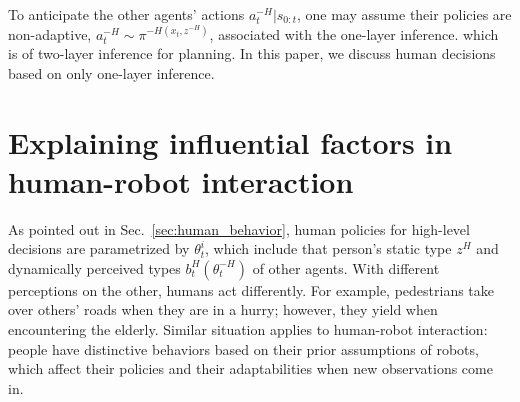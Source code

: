\documentclass[letterpaper, 10 pt, conference]{ieeeconf}  %
\begin{document}
To anticipate the other agents' actions $a^{-H}_{t}|s_{0:t}$, one may assume 
their policies are non-adaptive, $a^{-H}_t \sim \pi^{-H(x_t,z^{-H})}$, 
associated with the one-layer inference.
which is of two-layer inference for planning. In this paper, we discuss human 
decisions based on only one-layer inference.


\section{Explaining influential factors in human-robot interaction}
As pointed out in Sec.~\ref{sec:human_behavior}, human policies for high-level 
decisions are parametrized by $\theta^i_t$, which include that person's static 
type $z^H$ and dynamically perceived types $b^H_t(\theta^{-H}_t)$ of other 
agents. With different perceptions on the other, humans act 
differently. For example, pedestrians take over others' roads when they are in 
a hurry; however, they yield when encountering the elderly. Similar situation 
applies to human-robot interaction: people have distinctive behaviors based on 
their prior assumptions of robots, which affect their policies and their 
adaptabilities when new observations come in.
\end{document}
